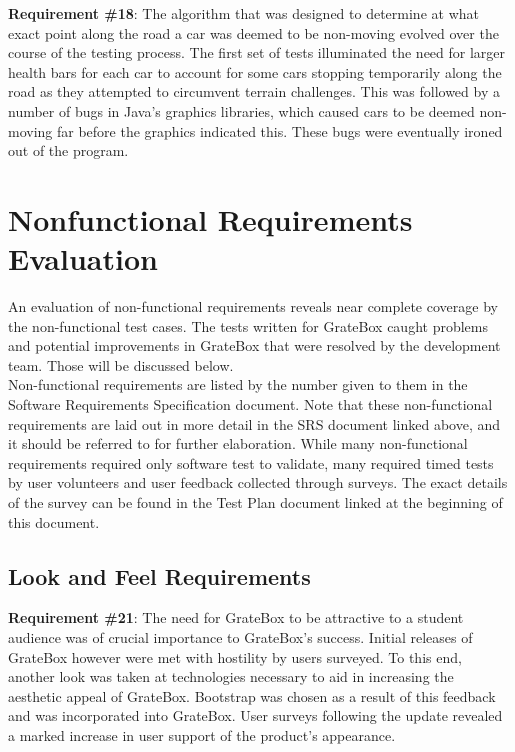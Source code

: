 \documentclass[12pt, titlepage]{article}
\begin{document}
\textbf{Requirement \#18}: The algorithm that was designed to determine at what 
exact point along the road a car was deemed to be non-moving evolved over the 
course of the testing process. The first set of tests illuminated the need for 
larger health bars for each car to account for some cars stopping temporarily 
along the road as they attempted to circumvent terrain challenges. This was 
followed by a number of bugs in Java's graphics libraries, which caused cars to 
be deemed non-moving far before the graphics indicated this. These bugs were 
eventually ironed out of the program.

\section{Nonfunctional Requirements Evaluation}

An evaluation of non-functional requirements reveals near complete coverage by 
the non-functional test cases. The tests written for GrateBox caught problems 
and  potential improvements in GrateBox that were resolved by the development 
team. Those will be discussed below.\\

Non-functional requirements are listed by the number given to them in the 
Software Requirements Specification document. Note that these non-functional 
requirements are laid out in more detail in the SRS document linked above, and 
it should be referred to for further elaboration. While many non-functional 
requirements required only software test to validate, many required timed tests 
by user volunteers and user feedback collected through surveys. The exact 
details of the survey can be found in the Test Plan document linked at the 
beginning of this document.\\

\subsection{Look and Feel Requirements}

\textbf{Requirement \#21}: The need for GrateBox to be attractive to a student 
audience was of crucial importance to GrateBox's success. Initial releases of 
GrateBox however were met with hostility by users surveyed. To this end, another 
look was taken at technologies necessary to aid in increasing the aesthetic 
appeal of GrateBox. Bootstrap was chosen as a result of this feedback and was 
incorporated into GrateBox. User surveys following the update revealed a marked 
increase in user support of the product's appearance.\\
\end{document}
